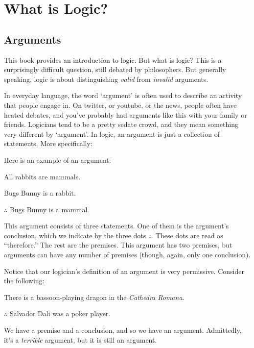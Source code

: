 \chapter{What is Logic?}

\section{Arguments}\label{s:Arguments}


This book provides an introduction to logic.  But what is logic? This is a surprisingly difficult question, still debated by philosophers. But generally speaking, logic is about distinguishing \emph{valid} from \emph{invalid} arguments.

In everyday language, the word `argument' is often used to describe an activity that people engage in.   On twitter, or youtube, or the news, people often have heated debates, and you've probably had arguments like this with your family or friends.  Logicians tend to be a pretty sedate crowd, and they mean something very different by `argument'.  In logic, an argument is just a collection of statements.  More specifically:


\noindent Here is an example of an argument:

\begin{earg}
\item[\ex{exarg1}]All rabbits are mammals.
\item[] Bugs Bunny is a rabbit.
\item[] $\therefore$ Bugs Bunny is a mammal.
\end{earg}
This argument consists of three statements.  One of them is the argument's conclusion, which we indicate by the three dots $\therefore\ $  These dots are read as ``therefore.'' The rest are the premises.  This argument has two premises, but arguments can have any number of premises (though, again, only one conclusion).

Notice that our logician's definition of an argument is very permissive. Consider the following:
	\begin{earg}
		\item[] There is a bassoon-playing dragon in the \emph{Cathedra Romana}.
		\item[] $\therefore$ Salvador Dali was a poker player.
	\end{earg}
We have a premise and a conclusion, and so we have an argument. Admittedly, it's a \emph{terrible} argument, but it is still an argument.  

